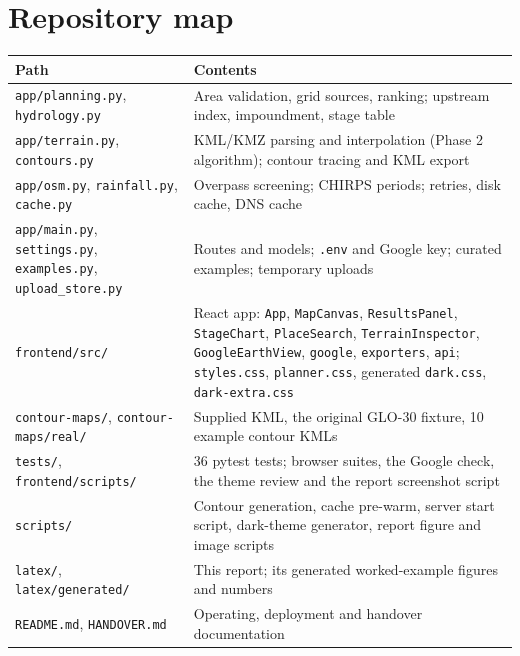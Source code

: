 \documentclass[11pt,a4paper]{article}
\newcommand{\code}[1]{\texttt{#1}}
\begin{document}
\section{Repository map}
\begin{tabularx}{\linewidth}{@{}L{58mm}Y@{}}
\toprule
\textbf{Path} & \textbf{Contents}\\
\midrule
\code{app/planning.py}, \code{hydrology.py} & Area validation, grid sources, ranking; upstream index, impoundment, stage table\\
\code{app/terrain.py}, \code{contours.py} & KML/KMZ parsing and interpolation (Phase 2 algorithm); contour tracing and KML export\\
\code{app/osm.py}, \code{rainfall.py}, \code{cache.py} & Overpass screening; CHIRPS periods; retries, disk cache, DNS cache\\
\code{app/main.py}, \code{settings.py}, \code{examples.py}, \code{upload\_store.py} & Routes and models; \code{.env} and Google key; curated examples; temporary uploads\\
\code{frontend/src/} & React app: \code{App}, \code{MapCanvas}, \code{ResultsPanel}, \code{StageChart}, \code{PlaceSearch}, \code{TerrainInspector}, \code{GoogleEarthView}, \code{google}, \code{exporters}, \code{api}; \code{styles.css}, \code{planner.css}, generated \code{dark.css}, \code{dark-extra.css}\\
\code{contour-maps/}, \code{contour-maps/real/} & Supplied KML, the original GLO-30 fixture, 10 example contour KMLs\\
\code{tests/}, \code{frontend/scripts/} & 36 pytest tests; browser suites, the Google check, the theme review and the report screenshot script\\
\code{scripts/} & Contour generation, cache pre-warm, server start script, dark-theme generator, report figure and image scripts\\
\code{latex/}, \code{latex/generated/} & This report; its generated worked-example figures and numbers\\
\code{README.md}, \code{HANDOVER.md} & Operating, deployment and handover documentation\\
\bottomrule
\end{tabularx}
\end{document}
